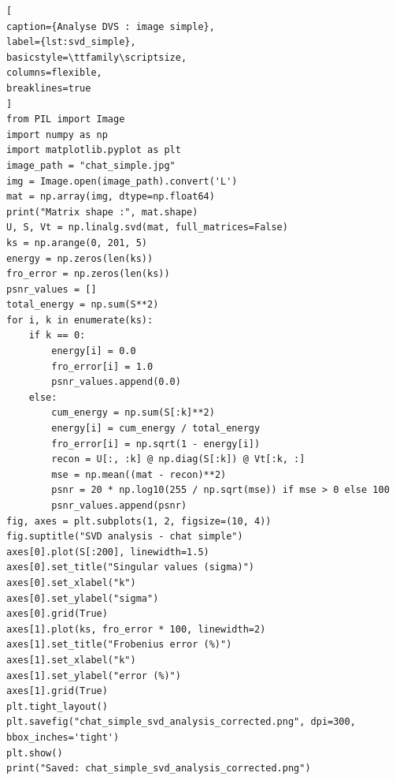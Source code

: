 \documentclass[12pt]{report}
\begin{document}
\clearpage
\begin{lstlisting}[
caption={Analyse DVS : image simple},
label={lst:svd_simple},
basicstyle=\ttfamily\scriptsize,
columns=flexible,
breaklines=true
]
from PIL import Image
import numpy as np
import matplotlib.pyplot as plt
image_path = "chat_simple.jpg"
img = Image.open(image_path).convert('L')
mat = np.array(img, dtype=np.float64)
print("Matrix shape :", mat.shape)
U, S, Vt = np.linalg.svd(mat, full_matrices=False)
ks = np.arange(0, 201, 5)
energy = np.zeros(len(ks))
fro_error = np.zeros(len(ks))
psnr_values = []
total_energy = np.sum(S**2)
for i, k in enumerate(ks):
    if k == 0:
        energy[i] = 0.0
        fro_error[i] = 1.0
        psnr_values.append(0.0)
    else:
        cum_energy = np.sum(S[:k]**2)
        energy[i] = cum_energy / total_energy
        fro_error[i] = np.sqrt(1 - energy[i])
        recon = U[:, :k] @ np.diag(S[:k]) @ Vt[:k, :]
        mse = np.mean((mat - recon)**2)
        psnr = 20 * np.log10(255 / np.sqrt(mse)) if mse > 0 else 100
        psnr_values.append(psnr)
fig, axes = plt.subplots(1, 2, figsize=(10, 4))
fig.suptitle("SVD analysis - chat simple")
axes[0].plot(S[:200], linewidth=1.5)
axes[0].set_title("Singular values (sigma)")
axes[0].set_xlabel("k")
axes[0].set_ylabel("sigma")
axes[0].grid(True)
axes[1].plot(ks, fro_error * 100, linewidth=2)
axes[1].set_title("Frobenius error (%)")
axes[1].set_xlabel("k")
axes[1].set_ylabel("error (%)")
axes[1].grid(True)
plt.tight_layout()
plt.savefig("chat_simple_svd_analysis_corrected.png", dpi=300, bbox_inches='tight')
plt.show()
print("Saved: chat_simple_svd_analysis_corrected.png")
\end{lstlisting}
\clearpage
\end{document}
